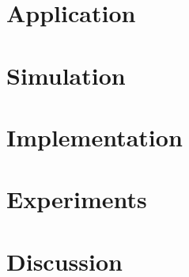 \chapter{Application}
\label{chp:part}


\chapter{Simulation}
\label{chp:simulation}


\chapter{Implementation}
\label{chp:implementation}


\chapter{Experiments}
\label{chp:experiments}


\chapter{Discussion}
\label{chp:discussion}

